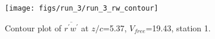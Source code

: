 \begin{figure}[H]
\centering
\texttt{[image: figs/run\_3/run\_3\_rw\_contour]}
\caption{Contour plot of $\overline{r^\prime w^\prime}$ at $z/c$=5.37, $V_{free}$=19.43, station 1.}
\label{fig:run_3_rw_contour}
\end{figure}


